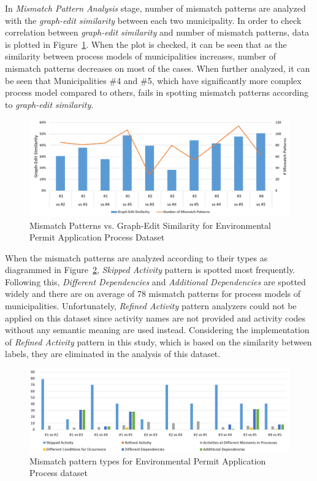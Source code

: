 In \textit{Mismatch Pattern Analysis} stage, number of mismatch patterns are analyzed with the \textit{graph-edit similarity} between each two municipality. In order to check correlation between \textit{graph-edit similarity} and number of mismatch patterns, data is plotted in Figure~\ref{fig:coselog-wabo-mismatch-pattern-analysis-results}. When the plot is checked, it can be seen that as the similarity between process models of municipalities increases, number of mismatch patterns decreases on most of the cases. When further analyzed, it can be seen that Municipalities \#4 and \#5, which have significantly more complex process model compared to others, fails in spotting mismatch patterns according to \textit{graph-edit similarity}.
\begin{figure}
	\centering
	\includegraphics[width=\textwidth]{5_results_discussions/coselog-wabo/mismatch-pattern-analysis-results}
	\caption{Mismatch Patterns vs. Graph-Edit Similarity for Environmental Permit Application Process Dataset}
  \label{fig:coselog-wabo-mismatch-pattern-analysis-results}
\end{figure}

When the mismatch patterns are analyzed according to their types as diagrammed in Figure~\ref{fig:coselog-wabo-mismatch-pattern-types}, \textit{Skipped Activity} pattern is spotted most frequently. Following this, \textit{Different Dependencies} and \textit{Additional Dependencies} are spotted widely and there are on average of 78 mismatch patterns for process models of municipalities. Unfortunately, \textit{Refined Activity} pattern analyzers could not be applied on this dataset since activity names are not provided and activity codes without any semantic meaning are used instead. Considering the implementation of \textit{Refined Activity} pattern in this study, which is based on the similarity between labels, they are eliminated in the analysis of this dataset.
\begin{figure}
	\centering
	\includegraphics[width=\textwidth]{5_results_discussions/coselog-wabo/mismatch-pattern-types}
	\caption{Mismatch pattern types for Environmental Permit Application Process dataset}
  \label{fig:coselog-wabo-mismatch-pattern-types}
\end{figure} 

